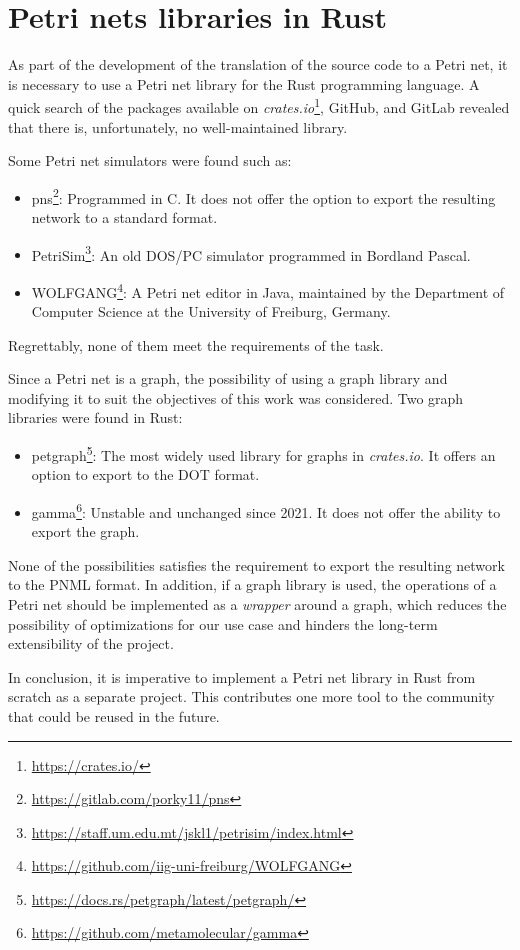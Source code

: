 \documentclass[../../Thesis.tex]{subfiles}
\begin{document}
\section{Petri nets libraries in Rust}

As part of the development of the translation of the source code to a Petri net,
it is necessary to use a Petri net library for the Rust programming language.
A quick search of the packages available on
\emph{crates.io}\footnote{\url{https://crates.io/}}, GitHub, and GitLab
revealed that there is, unfortunately, no well-maintained library.

Some Petri net simulators were found such as:

\begin{itemize}
    \item pns\footnote{\url{https://gitlab.com/porky11/pns}}:
          Programmed in C. It does not offer the option
          to export the resulting network to a standard format.
    \item PetriSim\footnote{\url{https://staff.um.edu.mt/jskl1/petrisim/index.html}}:
          An old DOS/PC simulator programmed in Bordland Pascal.
    \item WOLFGANG\footnote{\url{https://github.com/iig-uni-freiburg/WOLFGANG}}:
          A Petri net editor in Java, maintained by the Department of Computer Science
          at the University of Freiburg, Germany.
\end{itemize}

Regrettably, none of them meet the requirements of the task.

Since a Petri net is a graph, the possibility
of using a graph library and modifying it to suit the objectives of this work was considered.
Two graph libraries were found in Rust:

\begin{itemize}
    \item petgraph\footnote{\url{https://docs.rs/petgraph/latest/petgraph/}}:
          The most widely used library for graphs in \textit{crates.io}.
          It offers an option to export to the DOT format.
    \item gamma\footnote{\url{https://github.com/metamolecular/gamma}}:
          Unstable and unchanged since 2021. It does not offer the ability to export the graph.
\end{itemize}

None of the possibilities satisfies the requirement
to export the resulting network to the \acrshort{PNML} format.
In addition, if a graph library is used,
the operations of a Petri net should be implemented as a \emph{wrapper} around a graph,
which reduces the possibility of optimizations for our use case
and hinders the long-term extensibility of the project.

In conclusion, it is imperative
to implement a Petri net library in Rust from scratch as a separate project.
This contributes one more tool to the community that could be reused in the future.
\end{document}
